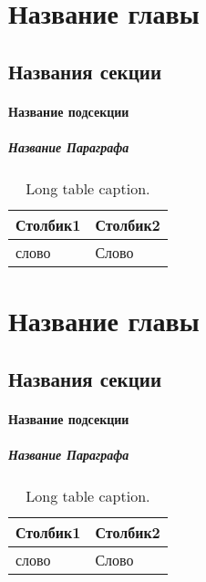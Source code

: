 \chapter{Название главы}
  \section{Названия секции}
    \subsubsection{Название подсекции}
      \paragraph{Название Параграфа}
        \lipsum[2]\cite{BibExampleRU}
        \begin{center}
          \begin{xltabular}{\linewidth}{|l|X|}
            \caption{Long table caption.\label{long}}                                                                                                    \\
            \hline
            Столбик1  & Столбик2    \\
            \hline
            слово     & Слово       \\
            \hline
          \end{xltabular}
        \end{center}


\chapter{Название главы}
  \section{Названия секции}
    \subsubsection{Название подсекции}
      \paragraph{Название Параграфа}
        \lipsum[2]\cite{BibExampleRU}

        \begin{center}
          \begin{xltabular}{\linewidth}{|l|X|}
            \caption{Long table caption.\label{long}}                                                                                                    \\
            \hline
            Столбик1  & Столбик2    \\
            \hline
            слово     & Слово       \\
            \hline
          \end{xltabular}
        \end{center}

